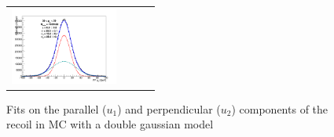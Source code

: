 \begin{figure}[!ht]
\begin{tabular}{cccc}
  \includegraphics[width=100pt]{figuresARC/recoil/FITS/MC/pfu2fit_3.png} \\
\end{tabular}
\caption{Fits on the parallel ($u_{1}$) and perpendicular ($u_{2}$) components of the recoil in MC  with a double gaussian model}
\label{fig:METrecoil4}
\end{figure}

